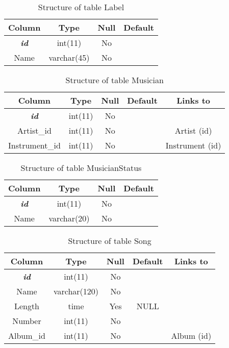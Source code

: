 %
%
\begin{longtable}{|c|c|c|c|} 
\caption{Structure of table Label} 
\label{tab:Label-structure} \\
\hline 
\multicolumn{1}{|c|}{\textbf{Column}} & \multicolumn{1}{|c|}{\textbf{Type}} & \multicolumn{1}{|c|}{\textbf{Null}} & \multicolumn{1}{|c|}{\textbf{Default}} \\ 
\hline
\textbf{\textit{id}} & int(11) & No &  \\ 
\hline 
Name & varchar(45) & No &  \\ 
\hline 
\end{longtable}

%
%
\begin{longtable}{|c|c|c|c|c|} 
\caption{Structure of table Musician} 
\label{tab:Musician-structure} \\
\hline 
\multicolumn{1}{|c|}{\textbf{Column}} & \multicolumn{1}{|c|}{\textbf{Type}} & \multicolumn{1}{|c|}{\textbf{Null}} & \multicolumn{1}{|c|}{\textbf{Default}} & \multicolumn{1}{|c|}{\textbf{Links to}} \\ 
\hline
\textbf{\textit{id}} & int(11) & No &  &  \\ 
\hline 
Artist\_id & int(11) & No &  & Artist (id) \\ 
\hline 
Instrument\_id & int(11) & No &  & Instrument (id) \\ 
\hline 
\end{longtable}

%
%
\begin{longtable}{|c|c|c|c|} 
\caption{Structure of table MusicianStatus} 
\label{tab:MusicianStatus-structure} \\
\hline 
\multicolumn{1}{|c|}{\textbf{Column}} & \multicolumn{1}{|c|}{\textbf{Type}} & \multicolumn{1}{|c|}{\textbf{Null}} & \multicolumn{1}{|c|}{\textbf{Default}} \\ 
\hline
\textbf{\textit{id}} & int(11) & No &  \\ 
\hline 
Name & varchar(20) & No &  \\ 
\hline 
\end{longtable}

%
%
\begin{longtable}{|c|c|c|c|c|} 
\caption{Structure of table Song} 
\label{tab:Song-structure} \\
\hline 
\multicolumn{1}{|c|}{\textbf{Column}} & \multicolumn{1}{|c|}{\textbf{Type}} & \multicolumn{1}{|c|}{\textbf{Null}} & \multicolumn{1}{|c|}{\textbf{Default}} & \multicolumn{1}{|c|}{\textbf{Links to}} \\ 
\hline
\textbf{\textit{id}} & int(11) & No &  &  \\ 
\hline 
Name & varchar(120) & No &  &  \\ 
\hline 
Length & time & Yes & NULL &  \\ 
\hline 
Number & int(11) & No &  &  \\ 
\hline 
Album\_id & int(11) & No &  & Album (id) \\ 
\hline 
\end{longtable}

